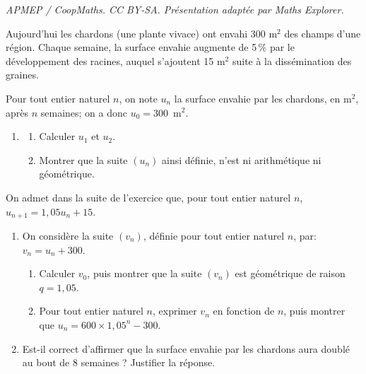 \documentclass[10pt]{article}
\begin{document}
\noindent\textit{APMEP / CoopMaths. CC BY-SA. Présentation adaptée par Maths Explorer.}\par\medskip
\medskip

Aujourd'hui les chardons (une plante vivace) ont envahi 300 m$^2$ des champs d'une région.
 Chaque semaine, la surface envahie augmente de 5\,\% par le développement des racines, auquel s'ajoutent 15 m$^2$ suite à la dissémination des graines.
 
Pour tout entier naturel $n$, on note $u_n$ la surface envahie par les chardons, en m$^2$, après $n$ semaines; on a donc $u_0 = 300$~m$^2$.

\medskip

\begin{enumerate}
\item 
\begin{enumerate}
\item Calculer $u_1$ et $u_2$.
\item Montrer que la suite $\left(u_n\right)$ ainsi définie, n'est ni arithmétique ni géométrique.
\end{enumerate}
\end{enumerate}	

On admet dans la suite de l'exercice que, pour tout entier naturel $n$,\: $u_{n+1} = 1,05u_n + 15$.
\begin{enumerate}[resume]
\item On considère la suite $\left(v_n\right)$, définie pour tout entier naturel $n$, par: $v_n = u_n + 300$.
\begin{enumerate}
\item Calculer $v_0$, puis montrer que la suite $\left(v_n\right)$ est géométrique de raison $q = 1,05$.
\item Pour tout entier naturel $n$, exprimer $v_n$ en fonction de $n$, puis montrer que $u_n = 600 \times 1,05^n - 300$.
\end{enumerate}
\item Est-il correct d'affirmer que la surface envahie par les chardons aura doublé au bout de $8$ semaines ? Justifier la réponse.
\end{enumerate}

\bigskip
\end{document}
